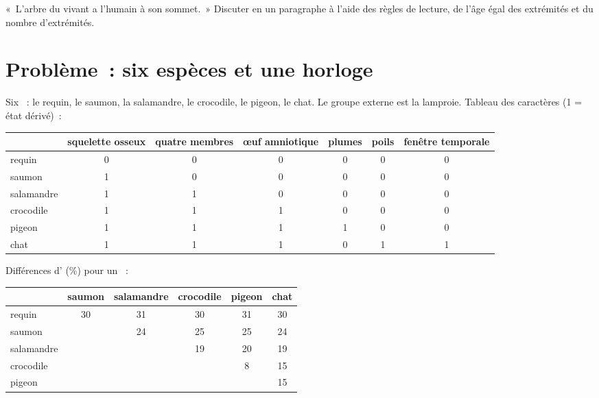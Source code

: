 \begin{exercise}[$\star\star\star$]\label{exo:g12:phylogenetic-trees:15}
«~L'arbre du vivant a l'humain à son sommet.~» Discuter en un
paragraphe à l'aide des règles de lecture, de l'âge égal des
extrémités et du nombre d'extrémités.
\end{exercise}

\section{Problème~: six espèces et une horloge}

\begin{problem}
\label{pb:g12:phylogenetic-trees:1}
Six ~: le requin, le saumon, la salamandre, le crocodile, le
pigeon, le chat. Le groupe externe est la lamproie. Tableau des
caractères (1 = état dérivé)~:

\begin{center}
\footnotesize
\begin{tabular}{lcccccc}
 & squelette osseux & quatre membres & œuf amniotique & plumes & poils & fenêtre temporale \\ \hline
requin & 0 & 0 & 0 & 0 & 0 & 0 \\
saumon & 1 & 0 & 0 & 0 & 0 & 0 \\
salamandre & 1 & 1 & 0 & 0 & 0 & 0 \\
crocodile & 1 & 1 & 1 & 0 & 0 & 0 \\
pigeon & 1 & 1 & 1 & 1 & 0 & 0 \\
chat & 1 & 1 & 1 & 0 & 1 & 1 \\
\end{tabular}
\end{center}

Différences d' (\%) pour un ~:

\begin{center}
\begin{tabular}{lccccc}
 & saumon & salamandre & crocodile & pigeon & chat \\ \hline
requin & 30 & 31 & 30 & 31 & 30 \\
saumon & & 24 & 25 & 25 & 24 \\
salamandre & & & 19 & 20 & 19 \\
crocodile & & & & 8 & 15 \\
pigeon & & & & & 15 \\
\end{tabular}
\end{center}


\end{problem}
